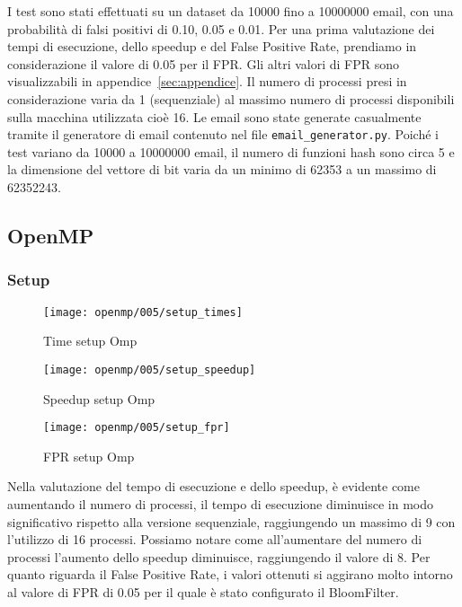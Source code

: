 I test sono stati effettuati su un dataset da 10000 fino a 10000000 email, con una probabilità di falsi positivi di
0.10, 0.05 e 0.01.
Per una prima valutazione dei tempi di esecuzione, dello speedup e del False Positive Rate, prendiamo in considerazione
il valore di 0.05 per il FPR. Gli altri valori di FPR sono visualizzabili in appendice~\ref{sec:appendice}.
Il numero di processi presi in considerazione varia da 1 (sequenziale) al massimo numero di processi disponibili sulla
macchina utilizzata cioè 16.
Le email sono state generate casualmente tramite il generatore di email contenuto nel file \texttt{email\_generator.py}.
Poiché i test variano da 10000 a 10000000 email, il numero di funzioni hash sono circa 5 e la dimensione del vettore di
bit varia da un minimo di 62353 a un massimo di 62352243.

\subsection{OpenMP}\label{subsec:openmp-test}
\subsubsection{Setup}\label{subsubsec:openmp-setup}
\begin{figure}[H]
    \centering
    \texttt{[image: openmp/005/setup\_times]}
        \caption{Time setup Omp}\label{fig:005-setup_time_omp}
    \endminipage\hfill
    \texttt{[image: openmp/005/setup\_speedup]}
        \caption{Speedup setup Omp}\label{fig:005-setup_speedup_omp}
    \endminipage\hfill
\end{figure}
\begin{figure}[H]
    \centering
    \texttt{[image: openmp/005/setup\_fpr]}
        \caption{FPR setup Omp}\label{fig:005-setup_fpr_omp}
    \endminipage\hfill
\end{figure}

Nella valutazione del tempo di esecuzione e dello speedup, è evidente come aumentando il numero di processi, il tempo
di esecuzione diminuisce in modo significativo rispetto alla versione sequenziale, raggiungendo un massimo di 9 con
l'utilizzo di 16 processi.
Possiamo notare come all'aumentare del numero di processi l'aumento dello speedup diminuisce, raggiungendo il valore di 8.
Per quanto riguarda il False Positive Rate, i valori ottenuti si aggirano molto intorno al valore di FPR
di 0.05 per il quale è stato configurato il BloomFilter.

